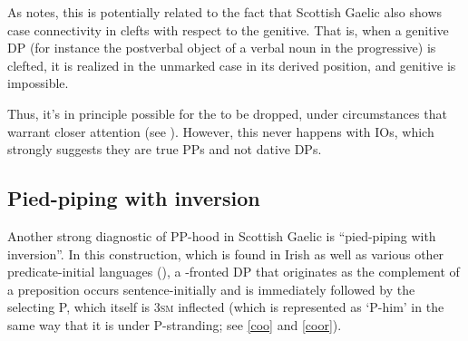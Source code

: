 \documentclass[output=paper,colorlinks,citecolor=brown]{langscibook}
\begin{document}
\noindent As \citet{gt:Adger:2022} notes, this is potentially related to the fact that Scottish Gaelic also shows case connectivity in clefts with respect to the genitive. That is, when a genitive DP (for instance the postverbal object of a verbal noun in the progressive) is clefted, it is realized in the unmarked case in its derived position, and genitive is impossible. 


\noindent Thus, it's in principle possible for the  to be dropped, under circumstances that warrant closer attention (see \citealt{gt:Thoms:2024p}). However, this never happens with IOs, which strongly suggests they are true PPs and not dative DPs. 

\subsection{Pied-piping with inversion}

Another strong diagnostic of PP-hood in Scottish Gaelic is ``pied-piping with inversion''. In this construction, which is found in Irish as well as various other predicate-initial languages (\citealt{gt:Broadwell:2006}), a -fronted DP that originates as the complement of a preposition occurs sentence-initially and is immediately followed by the selecting P, which itself is \textsc{3sm} inflected (which is represented as `P-him' in the same way that it is under P-stranding; see \ref{coo} and \ref{coor}). 


\end{document}
